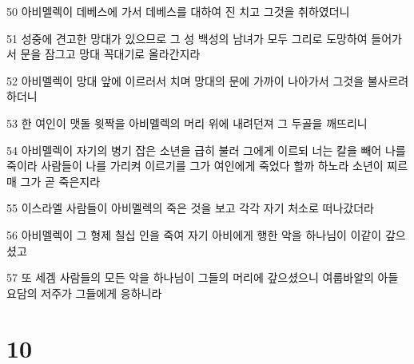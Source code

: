 \par 50 아비멜렉이 데베스에 가서 데베스를 대하여 진 치고 그것을 취하였더니
\par 51 성중에 견고한 망대가 있으므로 그 성 백성의 남녀가 모두 그리로 도망하여 들어가서 문을 잠그고 망대 꼭대기로 올라간지라
\par 52 아비멜렉이 망대 앞에 이르러서 치며 망대의 문에 가까이 나아가서 그것을 불사르려 하더니
\par 53 한 여인이 맷돌 윗짝을 아비멜렉의 머리 위에 내려던져 그 두골을 깨뜨리니
\par 54 아비멜렉이 자기의 병기 잡은 소년을 급히 불러 그에게 이르되 너는 칼을 빼어 나를 죽이라 사람들이 나를 가리켜 이르기를 그가 여인에게 죽었다 할까 하노라 소년이 찌르매 그가 곧 죽은지라
\par 55 이스라엘 사람들이 아비멜렉의 죽은 것을 보고 각각 자기 처소로 떠나갔더라
\par 56 아비멜렉이 그 형제 칠십 인을 죽여 자기 아비에게 행한 악을 하나님이 이같이 갚으셨고
\par 57 또 세겜 사람들의 모든 악을 하나님이 그들의 머리에 갚으셨으니 여룹바알의 아들 요담의 저주가 그들에게 응하니라

\chapter{10}

